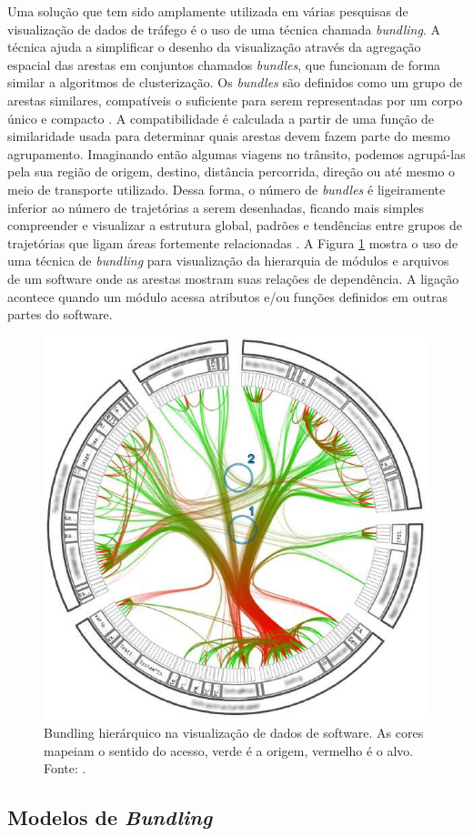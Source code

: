  Uma solução que tem sido amplamente utilizada em várias pesquisas de
visualização de dados de tráfego é o uso de uma técnica chamada
\emph{bundling}. A técnica ajuda a simplificar o desenho da visualização
através da agregação espacial das arestas em conjuntos chamados
\emph{bundles}, que funcionam de forma similar a algoritmos de clusterização. Os \emph{bundles} são
definidos como um grupo de arestas similares, compatíveis o suficiente para
serem representadas por um corpo único e compacto \citep{Lhuillier2017}. A
compatibilidade é calculada a partir de uma função de similaridade usada para
determinar quais arestas devem fazem parte do mesmo agrupamento.
Imaginando então algumas viagens no trânsito, podemos agrupá-las pela sua
região de origem, destino, distância percorrida, direção ou até mesmo o meio de
transporte utilizado.  Dessa forma, o número de \emph{bundles} é ligeiramente
inferior ao número de trajetórias a serem desenhadas, ficando mais simples
compreender e visualizar a estrutura global, padrões e tendências entre grupos
de trajetórias que ligam áreas fortemente relacionadas \citep{Zhou2013}.  A
Figura \ref{fig:bundling-hierarquico} mostra o uso de uma técnica de
\emph{bundling} para visualização da hierarquia de módulos e arquivos de um
software onde as arestas mostram suas relações de dependência. A ligação
acontece quando um módulo acessa atributos e/ou funções definidos em outras partes
do software.

\begin{figure}[!htb]
  \centering
  \includegraphics[width=.45\textwidth]{../figuras/hbundling.png}
  \caption[Bundling hierárquico na visualização de dados de software]{Bundling hierárquico na visualização de dados de software. As cores mapeiam
o sentido do acesso, verde é a origem, vermelho é o alvo. Fonte: \citep{Holten2006}.}
  \label{fig:bundling-hierarquico}
\end{figure}

\subsection{Modelos de \emph{Bundling}}
\label{sec:modelos-de-bundling}

